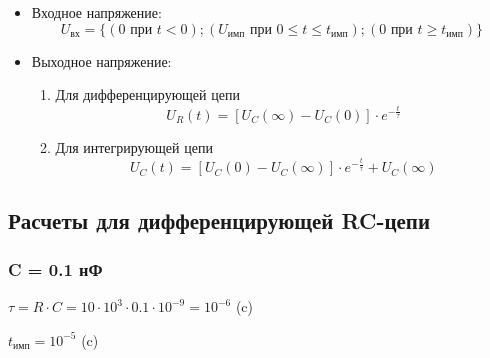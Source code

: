 \begin{itemize}

\item Входное напряжение:
\begin{equation}
U_\text{вх} = \{(0 \text{ при } t < 0); (U_\text{имп} \text{ при } 0 \leq t \leq t_\text{имп}); (0 \text{ при } t \geq t_\text{имп})\}
\end{equation}

\item Выходное напряжение:

\begin{enumerate}
\item Для дифференцирующей цепи
\begin{equation}
U_R(t) = [U_C(\infty) - U_C(0)] \cdot e^{-\frac{t}{\tau}}
\end{equation}

\item Для интегрирующей цепи
\begin{equation}
U_C(t) = [U_C(0) - U_C(\infty)] \cdot e^{-\frac{t}{\tau}} + U_C(\infty)
\end{equation}

\end{enumerate}
\end{itemize}

\subsection{Расчеты для дифференцирующей RC-цепи}

\subsubsection{C = 0.1 нФ}

		$\tau = R \cdot C = 10 \cdot 10^3 \cdot 0.1 \cdot 10^{-9} = 10^{-6}$ (c)
		
		$t_\text{имп} = 10^{-5}$ (c)
		
